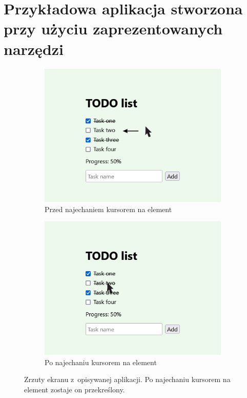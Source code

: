 \documentclass{SGGW-thesis}
\begin{document}
\chapter{Przykładowa aplikacja stworzona przy użyciu zaprezentowanych narzędzi}
\nopagebreak
\begin{figure}[h]
    \centering
    \begin{subfigure}{0.70\textwidth}
        \centering
        \includegraphics[width=\linewidth]{test-app-2.png}
        \caption{Przed najechaniem kursorem na element}
        \label{fig:test-app-hover-1}
    \end{subfigure}

    \begin{subfigure}{0.70\textwidth}
        \centering
        \includegraphics[width=\linewidth]{test-app-3.png}
        \caption{Po najechaniu kursorem na element}
        \label{fig:test-app-hover-b}
    \end{subfigure}

    \caption{Zrzuty ekranu z~opisywanej aplikacji. Po najechaniu kursorem na element zostaje on przekreślony.}
    \label{fig:test-app-hover}
\end{figure}
\clearpage
\end{document}
